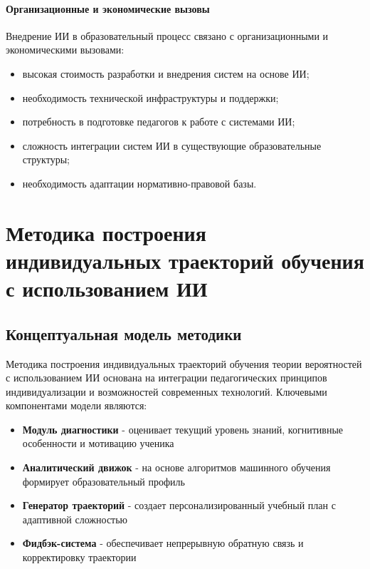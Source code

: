 \documentclass[a4paper,14pt]{extreport}
\begin{document}
\subsubsection{Организационные и экономические вызовы}

Внедрение ИИ в образовательный процесс связано с организационными и экономическими вызовами:
\begin{itemize}
    \item высокая стоимость разработки и внедрения систем на основе ИИ;
    \item необходимость технической инфраструктуры и поддержки;
    \item потребность в подготовке педагогов к работе с системами ИИ;
    \item сложность интеграции систем ИИ в существующие образовательные структуры;
    \item необходимость адаптации нормативно-правовой базы.
\end{itemize}

\chapter{Методика построения индивидуальных траекторий обучения с использованием ИИ}

\section{Концептуальная модель методики}
Методика построения индивидуальных траекторий обучения теории вероятностей с использованием ИИ основана на интеграции педагогических принципов индивидуализации и возможностей современных технологий. Ключевыми компонентами модели являются:
\begin{itemize}
    \item \textbf{Модуль диагностики} - оценивает текущий уровень знаний, когнитивные особенности и мотивацию ученика
    \item \textbf{Аналитический движок} - на основе алгоритмов машинного обучения формирует образовательный профиль
    \item \textbf{Генератор траекторий} - создает персонализированный учебный план с адаптивной сложностью
    \item \textbf{Фидбэк-система} - обеспечивает непрерывную обратную связь и корректировку траектории
\end{itemize}
\end{document}
